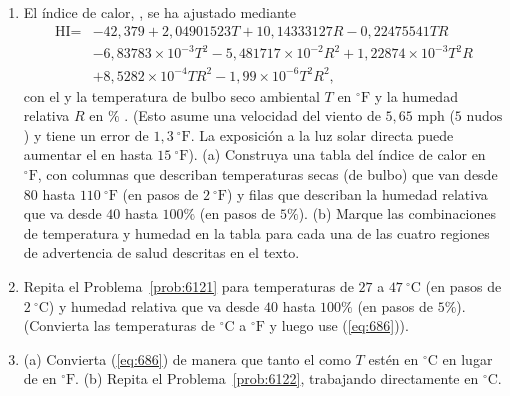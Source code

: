 \documentclass[12pt]{book}
\begin{document}
\begin{enumerate}
\item[6.121] \label{prob:6121} El índice de calor, , se ha ajustado mediante
\begin{equation}
\begin{split}
\text{HI} = & -42{,}379 + 2{,}04901523 T + 10{,}14333127 R - 0{,}22475541 T R \\
& - 6{,}83783 \times 10^{-3} T^2 - 5{,}481717 \times 10^{-2} R^2 + 1{,}22874 \times 10^{-3} T^2 R \\
& + 8{,}5282 \times 10^{-4} T R^2 - 1{,}99 \times 10^{-6} T^2 R^2,
\end{split}
\label{eq:686}
\end{equation}
con el  y la temperatura de bulbo seco ambiental $T$ en $^\circ\text{F}$ y la humedad relativa $R$ en $\%$ \cite{96,97}. (Esto asume una velocidad del viento de $5{,}65\text{ mph}$ ($5\text{ nudos}$) y tiene un error de $1{,}3\ ^\circ\text{F}$. La exposición a la luz solar directa puede aumentar el  en hasta $15\ ^\circ\text{F}$). (a) Construya una tabla del índice de calor en $^\circ\text{F}$, con columnas que describan temperaturas secas (de bulbo) que van desde $80$ hasta $110\ ^\circ\text{F}$ (en pasos de $2\ ^\circ\text{F}$) y filas que describan la humedad relativa que va desde $40$ hasta $100\%$ (en pasos de $5\%$). (b) Marque las combinaciones de temperatura y humedad en la tabla para cada una de las cuatro regiones de advertencia de salud descritas en el texto.

\item[6.122] \label{prob:6122} Repita el Problema~\ref{prob:6121} para temperaturas de $27$ a $47\ ^\circ\text{C}$ (en pasos de $2\ ^\circ\text{C}$) y humedad relativa que va desde $40$ hasta $100\%$ (en pasos de $5\%$). (Convierta las temperaturas de $^\circ\text{C}$ a $^\circ\text{F}$ y luego use (\ref{eq:686})).

\item[6.123] (a) Convierta (\ref{eq:686}) de manera que tanto el  como $T$ estén en $^\circ\text{C}$ en lugar de en $^\circ\text{F}$. (b) Repita el Problema~\ref{prob:6122}, trabajando directamente en $^\circ\text{C}$.


\end{enumerate}
\end{document}
